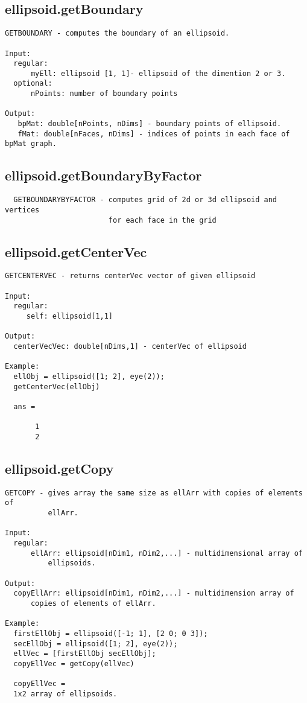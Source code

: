 \subsection{\texorpdfstring{ellipsoid.getBoundary}{getBoundary}}\label{method:ellipsoid.getBoundary}
\begin{verbatim}
GETBOUNDARY - computes the boundary of an ellipsoid.

Input:
  regular:
      myEll: ellipsoid [1, 1]- ellipsoid of the dimention 2 or 3.
  optional:
      nPoints: number of boundary points

Output:
   bpMat: double[nPoints, nDims] - boundary points of ellipsoid.
   fMat: double[nFaces, nDims] - indices of points in each face of bpMat graph.
\end{verbatim}
\subsection{\texorpdfstring{ellipsoid.getBoundaryByFactor}{getBoundaryByFactor}}\label{method:ellipsoid.getBoundaryByFactor}
\begin{verbatim}
  GETBOUNDARYBYFACTOR - computes grid of 2d or 3d ellipsoid and vertices
                        for each face in the grid
\end{verbatim}
\subsection{\texorpdfstring{ellipsoid.getCenterVec}{getCenterVec}}\label{method:ellipsoid.getCenterVec}
\begin{verbatim}
GETCENTERVEC - returns centerVec vector of given ellipsoid

Input:
  regular:
     self: ellipsoid[1,1]

Output:
  centerVecVec: double[nDims,1] - centerVec of ellipsoid

Example:
  ellObj = ellipsoid([1; 2], eye(2));
  getCenterVec(ellObj)

  ans =

       1
       2
\end{verbatim}
\subsection{\texorpdfstring{ellipsoid.getCopy}{getCopy}}\label{method:ellipsoid.getCopy}
\begin{verbatim}
GETCOPY - gives array the same size as ellArr with copies of elements of
          ellArr.

Input:
  regular:
      ellArr: ellipsoid[nDim1, nDim2,...] - multidimensional array of
          ellipsoids.

Output:
  copyEllArr: ellipsoid[nDim1, nDim2,...] - multidimension array of
      copies of elements of ellArr.

Example:
  firstEllObj = ellipsoid([-1; 1], [2 0; 0 3]);
  secEllObj = ellipsoid([1; 2], eye(2));
  ellVec = [firstEllObj secEllObj];
  copyEllVec = getCopy(ellVec)

  copyEllVec =
  1x2 array of ellipsoids.
\end{verbatim}
